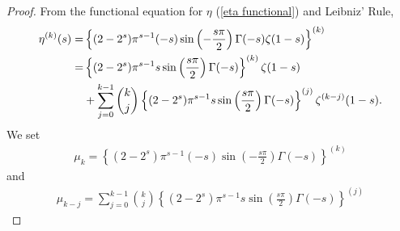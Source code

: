 \documentclass{amsart}
\theoremstyle{plain}
\theoremstyle{definition}
\begin{document}
\begin{proof}
From the functional equation for $\eta$ (\ref{eta functional}) and Leibniz' Rule, 
\begin{align}\label{eta k div}
    \eta^{(k)}(s) =& \left\{(2-2^{s})\pi^{s-1}(-s)\sin\left(-\frac{s\pi}{2}\right)\Gamma(-s)\zeta(1-s)\right\}^{(k)}\notag\\ 
    =&\left\{(2-2^{s})\pi^{s-1}s\sin\left(\frac{s\pi}{2}\right)\Gamma(-s)\right\}^{(k)}\zeta(1-s)\notag\\ 
    &+ \sum_{j=0}^{k-1}\binom{k}{j}\left\{(2-2^{s})\pi^{s-1}s\sin\left(\frac{s\pi}{2}\right)\Gamma(-s)\right\}^{(j)}\zeta^{(k-j)}(1-s).
\end{align}
We set 
\begin{align*}
    \mu_k = \left\{(2-2^{s})\pi^{s-1}(-s)\sin\left(-\frac{s\pi}{2}\right)\Gamma(-s)\right\}^{(k)}
\end{align*}
and 
\begin{align*}
    \mu_{k-j}=\sum_{j=0}^{k-1}\binom{k}{j}\left\{(2-2^{s})\pi^{s-1}s\sin\left(\frac{s\pi}{2}\right)\Gamma(-s)\right\}^{(j)}
\end{align*}
%

\end{proof}
\end{document}

